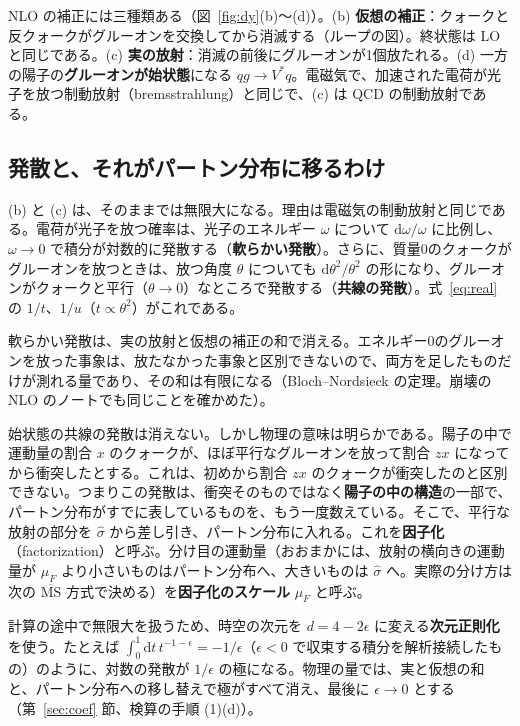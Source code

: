 \documentclass[a4paper,10pt]{ltjsarticle}
\newcommand{\dd}{\mathrm{d}}
\newcommand{\MSbar}{\overline{\mathrm{MS}}}
\begin{document}
NLO の補正には三種類ある（図~\ref{fig:dy}(b)〜(d)）。(b) \textbf{仮想の補正}：クォークと反クォークがグルーオンを交換してから消滅する（ループの図）。終状態は LO と同じである。(c) \textbf{実の放射}：消滅の前後にグルーオンが1個放たれる。(d) 一方の陽子の\textbf{グルーオンが始状態}になる $qg\to V^*q$。電磁気で、加速された電荷が光子を放つ制動放射（bremsstrahlung）と同じで、(c) は QCD の制動放射である。

\subsection{発散と、それがパートン分布に移るわけ}\label{sec:div}

(b) と (c) は、そのままでは無限大になる。理由は電磁気の制動放射と同じである。電荷が光子を放つ確率は、光子のエネルギー $\omega$ について $\dd\omega/\omega$ に比例し、$\omega\to0$ で積分が対数的に発散する（\textbf{軟らかい発散}）。さらに、質量0のクォークがグルーオンを放つときは、放つ角度 $\theta$ についても $\dd\theta^2/\theta^2$ の形になり、グルーオンがクォークと平行（$\theta\to0$）なところで発散する（\textbf{共線の発散}）。式~\eqref{eq:real} の $1/t$、$1/u$（$t\propto\theta^2$）がこれである。

軟らかい発散は、実の放射と仮想の補正の和で消える。エネルギー0のグルーオンを放った事象は、放たなかった事象と区別できないので、両方を足したものだけが測れる量であり、その和は有限になる（Bloch--Nordsieck の定理。崩壊の NLO のノートでも同じことを確かめた）。

始状態の共線の発散は消えない。しかし物理の意味は明らかである。陽子の中で運動量の割合 $x$ のクォークが、ほぼ平行なグルーオンを放って割合 $zx$ になってから衝突したとする。これは、初めから割合 $zx$ のクォークが衝突したのと区別できない。つまりこの発散は、衝突そのものではなく\textbf{陽子の中の構造}の一部で、パートン分布がすでに表しているものを、もう一度数えている。そこで、平行な放射の部分を $\hat\sigma$ から差し引き、パートン分布に入れる。これを\textbf{因子化}（factorization）と呼ぶ。分け目の運動量（おおまかには、放射の横向きの運動量が $\mu_F$ より小さいものはパートン分布へ、大きいものは $\hat\sigma$ へ。実際の分け方は次の $\MSbar$ 方式で決める）を\textbf{因子化のスケール} $\mu_F$ と呼ぶ。

計算の途中で無限大を扱うため、時空の次元を $d=4-2\epsilon$ に変える\textbf{次元正則化}を使う。たとえば $\int_0^1\dd t\,t^{-1-\epsilon}=-1/\epsilon$（$\epsilon<0$ で収束する積分を解析接続したもの）のように、対数の発散が $1/\epsilon$ の極になる。物理の量では、実と仮想の和と、パートン分布への移し替えで極がすべて消え、最後に $\epsilon\to0$ とする（第~\ref{sec:coef} 節、検算の手順 (1)(d)）。
\end{document}
